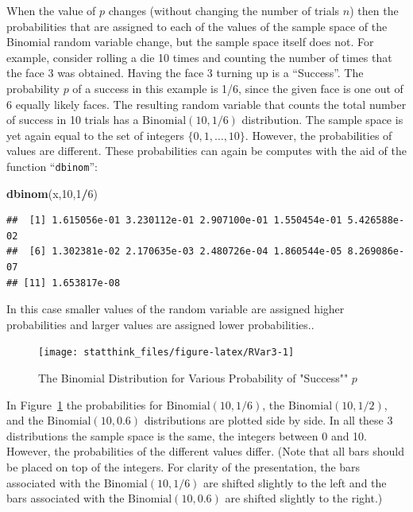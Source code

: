 \documentclass[
]{krantz}
\makeatletter
\newenvironment{Shaded}{\begin{snugshade}}{\end{snugshade}}
\newcommand{\DecValTok}[1]{\textcolor[rgb]{0.00,0.00,0.81}{#1}}
\newcommand{\KeywordTok}[1]{\textcolor[rgb]{0.13,0.29,0.53}{\textbf{#1}}}
\newcommand{\NormalTok}[1]{#1}
\newcommand{\OperatorTok}[1]{\textcolor[rgb]{0.81,0.36,0.00}{\textbf{#1}}}
\newenvironment{kframe}{%
\medskip{}
\setlength{\fboxsep}{.8em}
 \def\at@end@of@kframe{}%
 \ifinner\ifhmode%
  \def\at@end@of@kframe{\end{minipage}}%
  \begin{minipage}{\columnwidth}%
 \fi\fi%
 \def\FrameCommand##1{\hskip\@totalleftmargin \hskip-\fboxsep
 \colorbox{shadecolor}{##1}\hskip-\fboxsep
     \hskip-\linewidth \hskip-\@totalleftmargin \hskip\columnwidth}%
 \MakeFramed {\advance\hsize-\width
   \@totalleftmargin\z@ \linewidth\hsize
   \@setminipage}}%
 {\par\unskip\endMakeFramed%
 \at@end@of@kframe}
\renewenvironment{Shaded}{\begin{kframe}}{\end{kframe}}
\theoremstyle{definition}
\theoremstyle{definition}
\theoremstyle{definition}
\theoremstyle{remark}
\makeatother
\begin{document}
When the value of \(p\) changes (without changing the number of trials
\(n\)) then the probabilities that are assigned to each of the values of
the sample space of the Binomial random variable change, but the sample
space itself does not. For example, consider rolling a die 10 times and
counting the number of times that the face 3 was obtained. Having the
face 3 turning up is a ``Success''. The probability \(p\) of a success in
this example is 1/6, since the given face is one out of 6 equally likely
faces. The resulting random variable that counts the total number of
success in 10 trials has a \(\mathrm{Binomial}(10,1/6)\) distribution. The
sample space is yet again equal to the set of integers
\(\{0,1, \ldots,10\}\). However, the probabilities of values are
different. These probabilities can again be computes with the aid of the
function ``\texttt{dbinom}'':

\begin{Shaded}
\begin{Highlighting}[]
\KeywordTok{dbinom}\NormalTok{(x,}\DecValTok{10}\NormalTok{,}\DecValTok{1}\OperatorTok{/}\DecValTok{6}\NormalTok{)}
\end{Highlighting}
\end{Shaded}

\begin{verbatim}
##  [1] 1.615056e-01 3.230112e-01 2.907100e-01 1.550454e-01 5.426588e-02
##  [6] 1.302381e-02 2.170635e-03 2.480726e-04 1.860544e-05 8.269086e-07
## [11] 1.653817e-08
\end{verbatim}

In this case smaller values of the random variable are assigned higher
probabilities and larger values are assigned lower probabilities..

\begin{figure}

{\centering \texttt{[image: statthink\_files/figure-latex/RVar3-1]} 

}

\caption{The Binomial Distribution for Various Probability of "Success"" $p$}\label{fig:RVar3}
\end{figure}

In Figure~\ref{fig:RVar3} the probabilities for
\(\mathrm{Binomial}(10,1/6)\), the \(\mathrm{Binomial}(10,1/2)\), and the
\(\mathrm{Binomial}(10,0.6)\) distributions are plotted side by side. In
all these 3 distributions the sample space is the same, the integers
between 0 and 10. However, the probabilities of the different values
differ. (Note that all bars should be placed on top of the integers. For
clarity of the presentation, the bars associated with the
\(\mathrm{Binomial}(10,1/6)\) are shifted slightly to the left and the
bars associated with the \(\mathrm{Binomial}(10,0.6)\) are shifted
slightly to the right.)
\end{document}
